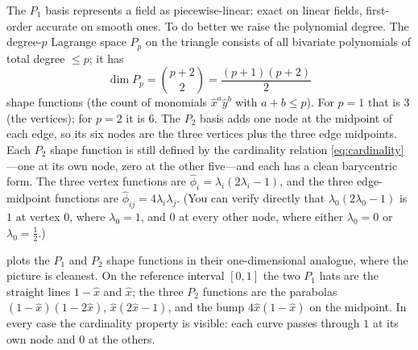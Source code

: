 The $P_1$ basis represents a field as piecewise-linear: exact on linear fields,
first-order accurate on smooth ones. To do better we raise the polynomial degree.
The degree-$p$ Lagrange space $P_p$ on the triangle consists of all bivariate
polynomials of total degree $\le p$; it has
\[
  \dim P_p = \binom{p+2}{2} = \frac{(p+1)(p+2)}{2}
\]
shape functions (the count of monomials $\hat x^a\hat y^b$ with $a+b\le p$). For
$p=1$ that is $3$ (the vertices); for $p=2$ it is $6$. The $P_2$ basis adds one node
at the midpoint of each edge, so its six nodes are the three vertices plus the three
edge midpoints. Each $P_2$ shape function is still defined by the cardinality
relation \eqref{eq:cardinality}---one at its own node, zero at the other five---and
each has a clean barycentric form. The three vertex functions are
$\hat\phi_i = \lambda_i(2\lambda_i-1)$, and the three edge-midpoint functions are
$\hat\phi_{ij} = 4\lambda_i\lambda_j$. (You can verify directly that
$\lambda_0(2\lambda_0-1)$ is $1$ at vertex $0$, where $\lambda_0=1$, and $0$ at every
other node, where either $\lambda_0=0$ or $\lambda_0=\tfrac12$.)

 plots the $P_1$ and $P_2$ shape functions in their
one-dimensional analogue, where the picture is cleanest. On the reference interval
$[0,1]$ the two $P_1$ hats are the straight lines $1-\hat x$ and $\hat x$; the three
$P_2$ functions are the parabolas $(1-\hat x)(1-2\hat x)$, $\hat x(2\hat x-1)$, and
the bump $4\hat x(1-\hat x)$ on the midpoint. In every case the cardinality property
is visible: each curve passes through $1$ at its own node and $0$ at the others.

